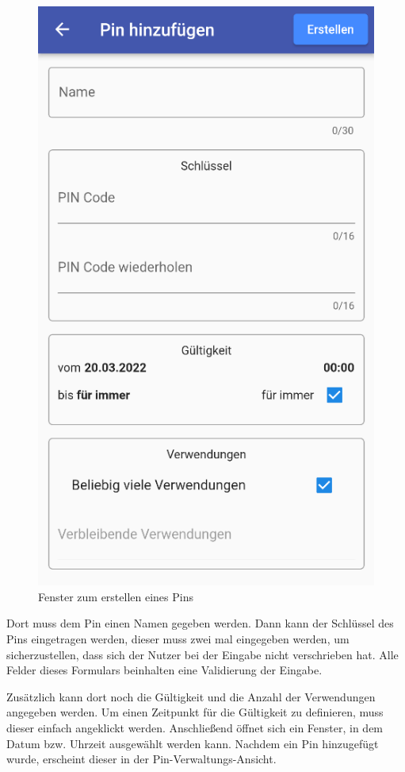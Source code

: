 \begin{figure}[H]
    \begin{center}
        \includegraphics[width=.6\textwidth]{images/mobile/CreatePin.png}
        \caption{Fenster zum erstellen eines Pins}
    \end{center}
\end{figure}

Dort muss dem Pin einen Namen gegeben werden.
Dann kann der Schlüssel des Pins eingetragen werden, dieser muss zwei mal eingegeben werden, um sicherzustellen,
dass sich der Nutzer bei der Eingabe nicht verschrieben hat.
Alle Felder dieses Formulars beinhalten eine Validierung der Eingabe.

Zusätzlich kann dort noch die Gültigkeit und die Anzahl der Verwendungen angegeben werden.
Um einen Zeitpunkt für die Gültigkeit zu definieren, muss dieser einfach angeklickt werden.
Anschließend öffnet sich ein Fenster, in dem Datum bzw. Uhrzeit ausgewählt werden kann.
Nachdem ein Pin hinzugefügt wurde, erscheint dieser in der Pin-Verwaltungs-Ansicht.

